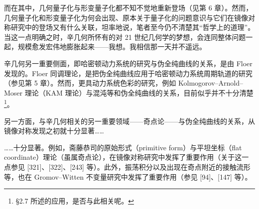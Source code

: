 而在其中，几何量子化与形变量子化都不知不觉地重新登场（见第 6 章）。然而，几何量子化和形变量子化为何会出现、原本关于量子化的问题意识与它们在镜像对称研究中的登场又有什么关联，坦率地说，笔者至今仍不清楚其“哲学上的道理”。当这一点明确之时，辛几何所怀有的对 21 世纪几何学的梦想，会连同整体问题一起，规模愈发宏伟地膨胀起来——我想。我相信那一天并不遥远。

辛几何另一重要侧面，即哈密顿动力系统的研究与伪全纯曲线的关系，是由 Floer 发现的。Floer 同调理论，是把伪全纯曲线应用于哈密顿动力系统周期轨道的研究（参见第 5 章）。然而，更具动力系统色彩的研究，例如 Kolmogorov–Arnold–Moser 理论（KAM 理论）与混沌等和伪全纯曲线的关系，目前似乎并不十分清楚\footnote{§2.7 所述的应用，是否与此相关呢。}。

另一方面，与辛几何相关的另一重要领域——奇点论——与伪全纯曲线的关系，从镜像对称发现之初就十分显著……

……十分显著。例如，斋藤恭司的原始形式（primitive form）与平坦坐标（flat coordinate）理论（虽属奇点论），在镜像对称研究中发挥了重要作用（关于这一点参见 [321]、[322]、[243] 等）。此外，振荡积分以及出现在奇点附近的接触流形等，也在 Gromov–Witten 不变量研究中发挥了重要作用（参见 [94]、[147] 等）。


